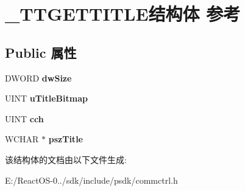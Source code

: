 \hypertarget{struct___t_t_g_e_t_t_i_t_l_e}{}\section{\+\_\+\+T\+T\+G\+E\+T\+T\+I\+T\+L\+E结构体 参考}
\label{struct___t_t_g_e_t_t_i_t_l_e}
\subsection*{Public 属性}
\begin{DoxyCompactItemize}
\item 
\mbox{\label{struct___t_t_g_e_t_t_i_t_l_e_ab335a161ccc7d5cfde282a4bdd867978}} 
D\+W\+O\+RD {\bfseries dw\+Size}
\item 
\mbox{\label{struct___t_t_g_e_t_t_i_t_l_e_a77d059d373d7643884c2fd63329aeb57}} 
U\+I\+NT {\bfseries u\+Title\+Bitmap}
\item 
\mbox{\label{struct___t_t_g_e_t_t_i_t_l_e_a313d7ef62a6e143c756e789c1ceb28fe}} 
U\+I\+NT {\bfseries cch}
\item 
\mbox{\label{struct___t_t_g_e_t_t_i_t_l_e_adca91e654d2e6b807ee7badd0266cfeb}} 
W\+C\+H\+AR $\ast$ {\bfseries psz\+Title}
\end{DoxyCompactItemize}


该结构体的文档由以下文件生成\+:\begin{DoxyCompactItemize}
\item 
E\+:/\+React\+O\+S-\/0../sdk/include/psdk/commctrl.\+h\end{DoxyCompactItemize}
